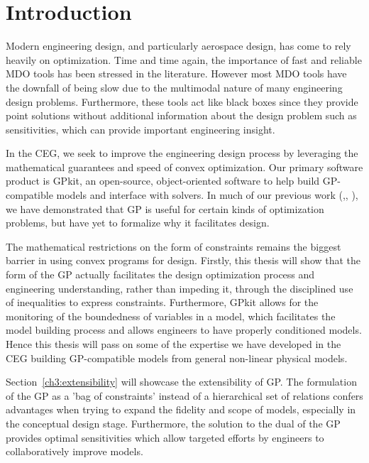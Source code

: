 \chapter{Introduction}
\label{ch1_intro}

Modern engineering design, and particularly aerospace design, has come to rely
heavily on optimization. Time and time again, the importance of fast and
reliable \gls{MDO} tools has been stressed in the literature. %
However most \gls{MDO} tools
have the downfall of being slow due to the multimodal nature of many
engineering design problems. Furthermore, these tools act like black boxes since
they provide point solutions without additional information about the design problem
such as sensitivities, which can provide important engineering insight.

In the \gls{CEG}, we seek to improve the engineering design process by
leveraging the mathematical guarantees and speed of convex optimization.
Our primary software product is GPkit, an
open-source, object-oriented software to help build \gls{GP}-compatible models and
interface with solvers. In much of our previous work
(\cite{gp_ac_design},\cite{sp_ac_design}, \cite{sp_engine}), we have demonstrated that
\gls{GP} is useful for certain kinds of optimization problems, but have yet to formalize why it
facilitates design.

The mathematical restrictions on the form of constraints remains the biggest
barrier in using convex programs for design. Firstly, this thesis will
show that the form of the \gls{GP} actually facilitates the design
optimization process
and engineering understanding, rather than impeding it, through the disciplined use
of inequalities to express constraints. Furthermore, GPkit allows for the
monitoring of the boundedness of variables in a model, which facilitates the model
building process and allows engineers
to have properly conditioned models. Hence this thesis will
pass on some of the expertise we have developed in the \gls{CEG} building
\gls{GP}-compatible models from general non-linear physical models.

Section~\ref{ch3:extensibility} will showcase the extensibility of \gls{GP}.
The formulation of the \gls{GP} as a 'bag of
constraints' instead of a hierarchical set of relations confers advantages
when trying to expand the fidelity and scope of models, especially in the
conceptual design stage. Furthermore, the solution to the dual of the \gls{GP}
provides optimal sensitivities which allow targeted efforts by engineers to
collaboratively improve models.

